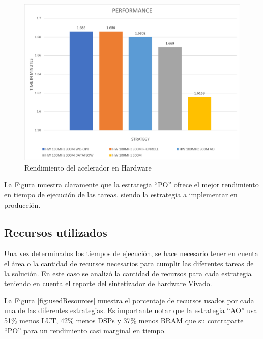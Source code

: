  \begin{figure}[!ht]
	\centering
		\includegraphics[scale=0.6]{Figures/generalPerformance}
	\caption{Rendimiento del acelerador en Hardware}
	\label{fig:generalPerformance}
\end{figure}

La Figura muestra claramente que la estrategia ``PO'' ofrece el mejor rendimiento en tiempo de ejecución de las tareas, siendo la estrategia a implementar en producción.

\clearpage

\subsection{Recursos utilizados}
Una vez determinados los tiempos de ejecución, se hace necesario tener en cuenta el área o la cantidad de recursos necesarios para cumplir las diferentes tareas de la solución. En este caso se analizó la cantidad de recursos para cada estrategia teniendo en cuenta el reporte del sintetizador de hardware Vivado.

La Figura \ref{fig:usedResources} muestra el porcentaje de recursos usados por cada una de las diferentes estrategias. Es importante notar que la estrategia ``AO'' usa 51\% menos LUT, 42\% menos DSPs y 37\% menos BRAM que su contraparte ``PO'' para un rendimiento casi marginal en tiempo.

